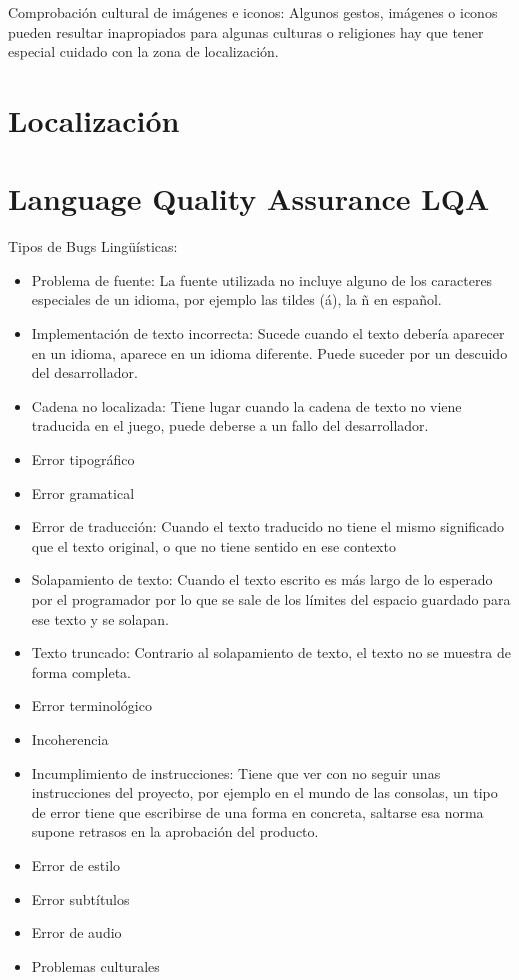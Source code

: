 Comprobación cultural de imágenes e iconos: Algunos gestos, imágenes o iconos pueden resultar inapropiados para algunas culturas o religiones hay que tener especial cuidado con la zona de localización.

\section{Localización}
\section{Language Quality Assurance LQA }
Tipos de Bugs Lingüísticas:
\begin{itemize}
	\item Problema de fuente: La fuente utilizada no incluye alguno de los caracteres especiales de un idioma, por ejemplo las tildes (á), la ñ en español.
	\item Implementación de texto incorrecta: Sucede cuando el texto debería aparecer en un idioma, aparece en un idioma diferente. Puede suceder por un descuido del desarrollador.
	\item Cadena no localizada: Tiene lugar cuando la cadena de texto no viene traducida en el juego, puede deberse a un fallo del desarrollador.
	\item Error tipográfico
	\item Error gramatical
	\item Error de traducción: Cuando el texto traducido no tiene el mismo significado que el texto original, o que no tiene sentido en ese contexto
	\item Solapamiento de texto: Cuando el texto escrito es más largo de lo esperado por el programador por lo que se sale de los límites del espacio guardado para ese texto y se solapan. 
	\item Texto truncado: Contrario al solapamiento de texto, el texto no se muestra de forma completa.
	\item Error terminológico
	\item Incoherencia
	\item Incumplimiento de instrucciones: Tiene que ver con no seguir unas instrucciones del proyecto, por ejemplo en el mundo de las consolas, un tipo de error tiene que escribirse de una forma en concreta, saltarse esa norma supone retrasos en la aprobación del producto.
	\item Error de estilo
	\item Error subtítulos
	\item Error de audio
	\item Problemas culturales
\end{itemize}
